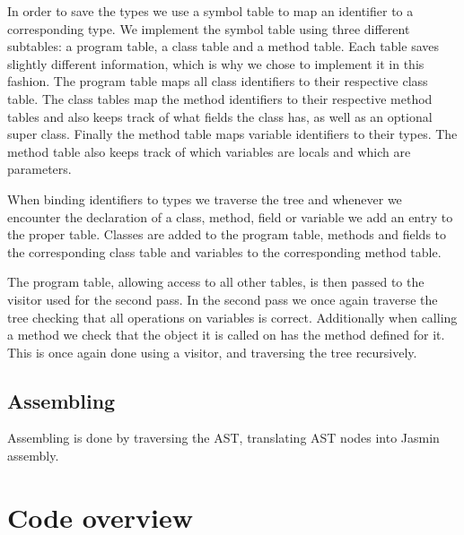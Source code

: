 \documentclass[a4paper]{article}
\begin{document}
In order to save the types we use a symbol table to map an identifier to a
corresponding type. We implement the symbol table using three different
subtables: a program table, a class table and a method table. Each table saves
slightly different information, which is why we chose to implement it in this
fashion. The program table maps all class identifiers to their respective class
table. The class tables map the method identifiers to their respective method
tables and also keeps track of what fields the class has, as well as an optional
super class. Finally the method table maps variable identifiers to their types.
The method table also keeps track of which variables are locals and which are
parameters.

When binding identifiers to types we traverse the tree and whenever we encounter
the declaration of a class, method, field or variable we add an entry to the
proper table. Classes are added to the program table, methods and fields to the
corresponding class table and variables to the corresponding method table.

The program table, allowing access to all other tables, is then passed to the
visitor used for the second pass. In the second pass we once again traverse the
tree checking that all operations on variables is correct. Additionally when
calling a method we check that the object it is called on has the method defined
for it. This is once again done using a visitor, and traversing the tree
recursively.

\subsection{Assembling}

Assembling is done by traversing the AST, translating AST nodes into Jasmin
assembly.

\section{Code overview}
\end{document}
